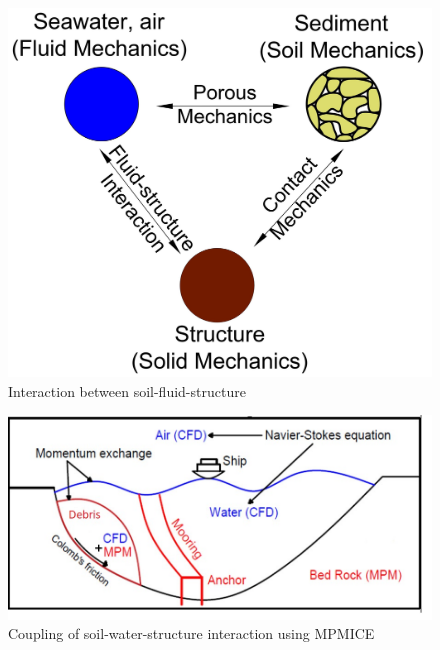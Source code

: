 \documentclass[preprint,12pt]{elsarticle}
\begin{document}
\begin{figure}[h]
\center
\includegraphics[scale=.3]{3phases.jpg}
\caption{Interaction between soil-fluid-structure}
\label{fig:3phases}
\end {figure}
%
%
%
%
\begin{figure}[h]
\center
\includegraphics[scale=.4]{MPMICE.jpg}
\caption{Coupling of soil-water-structure interaction using MPMICE}
\label{fig:MPMICE}
\end {figure}
%
%
\end{document}
